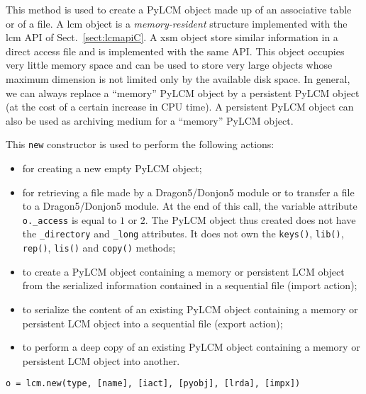 This method is used to create a PyLCM object made up of an associative table or of a file. A {\sc lcm} object is a {\sl memory-resident} structure
implemented with the {\sc lcm} API of Sect.~\ref{sect:lcmapiC}. A {\sc xsm} object store similar information in a direct access file and is implemented with the same API. This object occupies very little memory space and can be
used to store very large objects whose maximum dimension is not
limited only by the available disk space. In general, we can always replace
a ``memory'' PyLCM object  by a persistent PyLCM object (at the cost of a certain
increase in CPU time). A persistent PyLCM object can
also be used as archiving medium for a ``memory'' PyLCM object.

\vskip 0.2cm

This {\tt new} constructor is used to perform the following actions:
\begin{itemize}
\item for creating a new empty PyLCM object;
\item for retrieving a file made by a Dragon5/Donjon5 module or to transfer a file to a Dragon5/Donjon5 module. At the end of this call, the variable
attribute {\tt o.\_access} is equal to $1$ or  $2$. The PyLCM object thus created does not have
the {\tt \_directory} and {\tt \_long} attributes. It does not own the {\tt keys()},
{\tt lib()}, {\tt rep()}, {\tt lis()} and {\tt copy()} methods;
\item to create a PyLCM object containing a memory or persistent LCM object from the serialized information contained in a sequential file (import action);
\item to serialize the content of an existing PyLCM object containing a memory or persistent LCM object into a sequential file (export action);
\item to perform a deep copy of an existing PyLCM object containing a memory or persistent LCM object into another.
\end{itemize}

\begin{verbatim}
o = lcm.new(type, [name], [iact], [pyobj], [lrda], [impx])
\end{verbatim}

